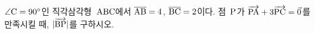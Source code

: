 $\angle\mathrm{C}=90^\circ$인 직각삼각형~$\mathrm{ABC}$에서 $\overline{\mathrm{AB}}=4$, $\overline{\mathrm{BC}}=2$이다. 점~$\mathrm{P}$가 $\overrightarrow{\mathrm{PA}}+3\overrightarrow{\mathrm{PC}}=\vec{0}$를 만족시킬 때, $|\overrightarrow{\mathrm{BP}}|$를 구하시오.
